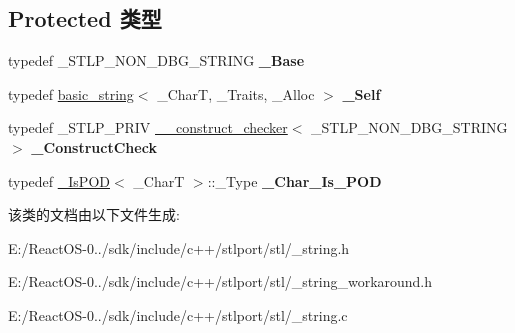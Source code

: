 \subsection*{Protected 类型}
\begin{DoxyCompactItemize}
\item 
\mbox{\label{classbasic__string_add1e603bb73403cb03012affa69ecab7}} 
typedef \+\_\+\+S\+T\+L\+P\+\_\+\+N\+O\+N\+\_\+\+D\+B\+G\+\_\+\+S\+T\+R\+I\+NG {\bfseries \+\_\+\+Base}
\item 
\mbox{\label{classbasic__string_af0bb5ab56ac17a285e606032dd1dcf0b}} 
typedef \hyperlink{classbasic__string}{basic\+\_\+string}$<$ \+\_\+\+CharT, \+\_\+\+Traits, \+\_\+\+Alloc $>$ {\bfseries \+\_\+\+Self}
\item 
\mbox{\label{classbasic__string_a627a860151fa9644756814bec31cad1a}} 
typedef \+\_\+\+S\+T\+L\+P\+\_\+\+P\+R\+IV \hyperlink{class____construct__checker}{\+\_\+\+\_\+construct\+\_\+checker}$<$ \+\_\+\+S\+T\+L\+P\+\_\+\+N\+O\+N\+\_\+\+D\+B\+G\+\_\+\+S\+T\+R\+I\+NG $>$ {\bfseries \+\_\+\+Construct\+Check}
\item 
\mbox{\label{classbasic__string_a76aee8569210d6403e9673eb1d2cd45b}} 
typedef \hyperlink{struct___is_p_o_d}{\+\_\+\+Is\+P\+OD}$<$ \+\_\+\+CharT $>$\+::\+\_\+\+Type {\bfseries \+\_\+\+Char\+\_\+\+Is\+\_\+\+P\+OD}
\end{DoxyCompactItemize}


该类的文档由以下文件生成\+:\begin{DoxyCompactItemize}
\item 
E\+:/\+React\+O\+S-\/0../sdk/include/c++/stlport/stl/\+\_\+string.\+h\item 
E\+:/\+React\+O\+S-\/0../sdk/include/c++/stlport/stl/\+\_\+string\+\_\+workaround.\+h\item 
E\+:/\+React\+O\+S-\/0../sdk/include/c++/stlport/stl/\+\_\+string.\+c\end{DoxyCompactItemize}

